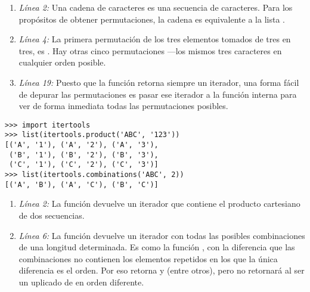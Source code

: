 \begin{enumerate}

\item \emph{Línea 2:} Una cadena de caracteres es una secuencia de caracteres. Para los propósitos de obtener permutaciones, la cadena  es equivalente a la lista \codigo{['A', 'B', 'C']}.

\item \emph{Línea 4:} La primera permutación de los tres elementos \codigo{['A', 'B', 'C']} tomados de tres en tres, es . Hay otras cinco permutaciones ---los mismos tres caracteres en cualquier orden posible.

\item \emph{Línea 19:} Puesto que la función  retorna siempre un iterador, una forma fácil de depurar las permutaciones es pasar ese iterador a la función interna  para ver de forma inmediata todas las permutaciones posibles.

\end{enumerate}

\noindent\begin{minipage}{\textwidth}
\begin{lstlisting}[mathescape=True]
>>> import itertools
>>> list(itertools.product('ABC', '123'))
[('A', '1'), ('A', '2'), ('A', '3'), 
 ('B', '1'), ('B', '2'), ('B', '3'), 
 ('C', '1'), ('C', '2'), ('C', '3')]
>>> list(itertools.combinations('ABC', 2))
[('A', 'B'), ('A', 'C'), ('B', 'C')]
\end{lstlisting}
\end{minipage}

\begin{enumerate}

\item \emph{Línea 2:} La función  devuelve un iterador que contiene el producto cartesiano de dos secuencias.

\item \emph{Línea 6:} La función  devuelve un iterador con todas las posibles combinaciones de una longitud determinada. Es como la función , con la diferencia que las combinaciones no contienen los elementos repetidos en los que la única diferencia es el orden. Por eso  retorna  y  (entre otros), pero  no retornará  al ser un uplicado de  en orden diferente.

\end{enumerate}

